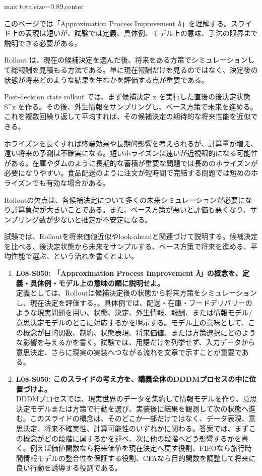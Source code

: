 \begin{minipage}[t]{0.58\textwidth}
\begin{adjustbox}{max totalsize={\textwidth}{0.89\textheight},center}
\begin{minipage}{\textwidth}\scriptsize
{}このページでは「Approximation Process Improvement 𝜆」を理解する。スライド上の表現は短いが、試験では定義、具体例、モデル上の意味、手法の限界まで説明できる必要がある。\par
Rollout は、現在の候補決定を選んだ後、将来をある方策でシミュレーションして総報酬を見積もる方法である。単に現在報酬だけを見るのではなく、決定後の状態が将来どのような結果を生むかを評価する点が重要である。\par
Post-decision state rollout では、まず候補決定 x を実行した直後の後決定状態 S\textasciicircum{}x を作る。その後、外生情報をサンプリングし、ベース方策で未来を進める。これを複数回繰り返して平均すれば、その候補決定の期待的な将来性能を近似できる。\par
ホライズンを長くすれば終端効果や長期的影響を考えられるが、計算量が増え、遠い将来の予測は不確実になる。短いホライズンは速いが近視眼的になる可能性がある。在庫やダムのように長期的な蓄積が重要な問題では長めのホライズンが必要になりやすい。食品配送のように注文が短時間で完結する問題では短めのホライズンでも有効な場合がある。\par
Rolloutの欠点は、各候補決定について多くの未来シミュレーションが必要になり計算負荷が大きいことである。また、ベース方策が悪いと評価も悪くなり、サンプリング数が少ないと推定が不安定になる。\par
試験では、Rolloutを将来価値近似やlook-aheadと関連づけて説明する。候補決定を比べる、後決定状態から未来をサンプルする、ベース方策で将来を進める、平均性能で選ぶ、という流れを書くとよい。\par{}\begin{enumerate}\item \textbf{L08-S050: 「Approximation Process Improvement 𝜆」の概念を、定義・具体例・モデル上の意味の順に説明せよ。}\\定義としては、Rolloutは候補決定後の状態から将来方策をシミュレーションし、現在決定を評価する。。具体例では、配送・在庫・フードデリバリーのような現実問題を用い、状態、決定、外生情報、報酬、または情報モデル/意思決定モデルのどこに対応するかを明示する。モデル上の意味として、この概念が目的関数、制約、状態表現、将来価値、または方策選択にどのような影響を与えるかを書く。試験では、用語だけを列挙せず、入力データから意思決定、さらに現実の実装へつながる流れを文章で示すことが重要である。\item \textbf{L08-S050: このスライドの考え方を、講義全体のDDDMプロセスの中に位置づけよ。}\\DDDMプロセスでは、現実世界のデータを集約して情報モデルを作り、意思決定モデルまたは方策で行動を選び、実装後に結果を観測して次の状態へ進む。このスライドの概念は、そのどこか一部だけではなく、データ表現、意思決定、将来不確実性、計算可能性のいずれかに関わる。答案では、まずこの概念がどの段階に属するかを述べ、次に他の段階へどう影響するかを書く。例えば価値関数なら将来価値を現在決定へ戻す役割、FIFOなら旅行時間情報モデルの整合性を保証する役割、CFAなら目的関数を調整して将来に良い行動を誘導する役割である。\end{enumerate}

\end{minipage}
\end{adjustbox}
\end{minipage}
